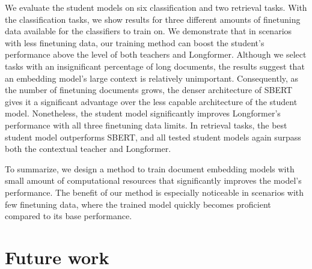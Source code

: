 We evaluate the student models on six classification and two retrieval tasks.
With the classification tasks, we show results for three different amounts of
finetuning data available for the classifiers to train on. We demonstrate that
in scenarios with less finetuning data, our training method can boost the
student's performance above the level of both teachers and Longformer. Although
we select tasks with an insignificant percentage of long documents, the results
suggest that an embedding model's large context is relatively unimportant.
Consequently, as the number of finetuning documents grows, the denser
architecture of SBERT gives it a significant advantage over the less capable
architecture of the student model. Nonetheless, the student model significantly
improves Longformer's performance with all three finetuning data limits. In
retrieval tasks, the best student model outperforms SBERT, and all tested
student models again surpass both the contextual teacher and Longformer.

To summarize, we design a method to train document embedding models with small
amount of computational resources that significantly improves the model's
performance. The benefit of our method is especially noticeable in scenarios
with few finetuning data, where the trained model quickly becomes proficient
compared to its base performance.


\section*{Future work}

